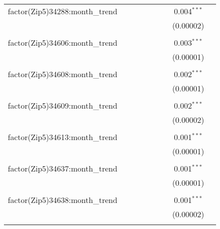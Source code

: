 \begin{table}[H]
{\begin{tabular}{@{\extracolsep{5pt}}lcccccccc}
  factor(Zip5)34288:month\_trend &  &  &  &  &  &  & 0.004$^{***}$ &  \\  

   &  &  &  &  &  &  & (0.00002) &  \\  

   & & & & & & & & \\  

  factor(Zip5)34606:month\_trend &  &  &  &  &  &  & 0.003$^{***}$ &  \\  

   &  &  &  &  &  &  & (0.00001) &  \\  

   & & & & & & & & \\  

  factor(Zip5)34608:month\_trend &  &  &  &  &  &  & 0.002$^{***}$ &  \\  

   &  &  &  &  &  &  & (0.00001) &  \\  

   & & & & & & & & \\  

  factor(Zip5)34609:month\_trend &  &  &  &  &  &  & 0.002$^{***}$ &  \\  

   &  &  &  &  &  &  & (0.00002) &  \\  

   & & & & & & & & \\  

  factor(Zip5)34613:month\_trend &  &  &  &  &  &  & 0.001$^{***}$ &  \\  

   &  &  &  &  &  &  & (0.00001) &  \\  

   & & & & & & & & \\  

  factor(Zip5)34637:month\_trend &  &  &  &  &  &  & 0.001$^{***}$ &  \\  

   &  &  &  &  &  &  & (0.00001) &  \\  

   & & & & & & & & \\  

  factor(Zip5)34638:month\_trend &  &  &  &  &  &  & 0.001$^{***}$ &  \\  

   &  &  &  &  &  &  & (0.00002) &  \\  

   & & & & & & & & \\  


\end{tabular}}
\end{table}
